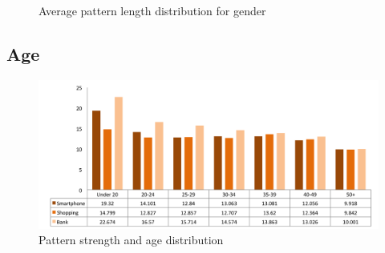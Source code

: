     \begin{figure}[H]
    	\centering
    	\caption{Average pattern length distribution for gender}
    	\label{fig:avgpatterndistgender}
    \end{figure}

	\subsection{Age}

		\begin{figure}[H]
	    \centering
	    \includegraphics[width=\textwidth]{pics/analysis/strengthagedist.png}
	    \caption{Pattern strength and age distribution}
	    \label{fig:strengthagedist}
  	\end{figure}

